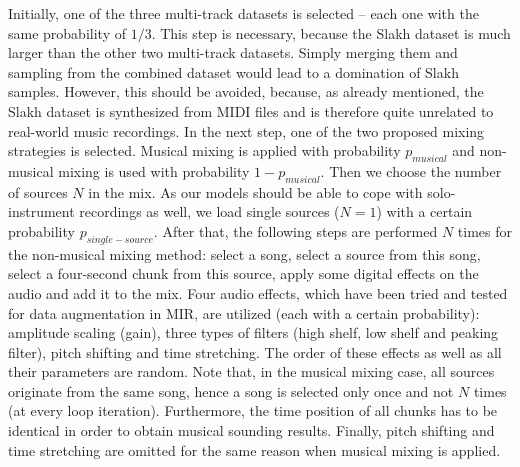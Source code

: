 \documentclass{article}
\begin{document}
Initially, one of the three multi-track datasets is selected -- each one with the same probability of $1/3$. This step is necessary, because the Slakh dataset is much larger than the other two multi-track datasets. Simply merging them and sampling from the combined dataset would lead to a domination of Slakh samples. However, this should be avoided, because, as already mentioned, the Slakh dataset is synthesized from MIDI files and is therefore quite unrelated to real-world music recordings. In the next step, one of the two proposed mixing strategies is selected. Musical mixing is applied with probability $p_{musical}$ and non-musical mixing is used with probability $1 - p_{musical}$. Then we choose the number of sources $N$ in the mix. As our models should be able to cope with solo-instrument recordings as well, we load single sources ($N=1$) with a certain probability $p_{single-source}$. After that, the following steps are performed $N$ times for the non-musical mixing method: select a song, select a source from this song, select a four-second chunk from this source, apply some digital effects on the audio and add it to the mix. Four audio effects, which have been tried and tested for data augmentation in MIR, are utilized (each with a certain probability): amplitude scaling (gain), three types of filters (high shelf, low shelf and peaking filter), pitch shifting and time stretching. The order of these effects as well as all their parameters are random. Note that, in the musical mixing case, all sources originate from the same song, hence a song is selected only once and not $N$ times (at every loop iteration). Furthermore, the time position of all chunks has to be identical in order to obtain musical sounding results. Finally, pitch shifting and time stretching are omitted for the same reason when musical mixing is applied.
\end{document}
